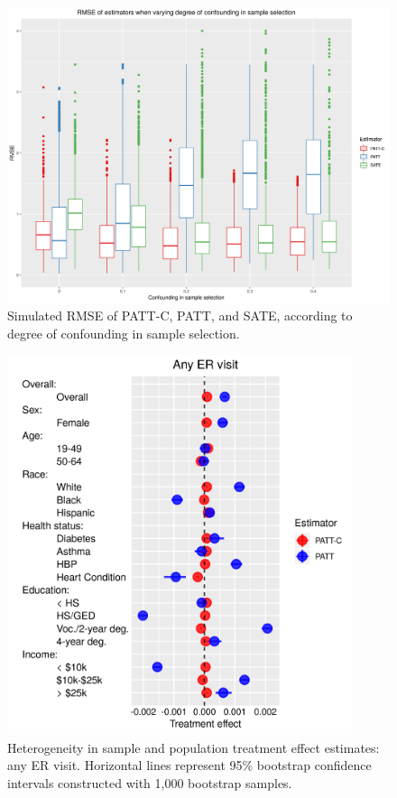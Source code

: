 \documentclass[hidelinks,12pt]{article}
\begin{document}
{\begin{appendices}
\begin{figure}[htbp]
	\begin{center}
		\includegraphics[width = 1\textwidth]{rmse_boxplots_RateConS}
		\caption{Simulated RMSE of PATT-C, PATT, and SATE, according to degree of confounding in sample selection.\label{fig:rmse_boxplots_RateConS}}
	\end{center}
\end{figure}

\begin{figure}[htbp]
	\begin{center}
		\includegraphics[width = 0.9\textwidth]{any-visit-plot}
		\caption{Heterogeneity in sample and population treatment effect estimates: any ER visit. Horizontal lines represent 95\% bootstrap confidence intervals constructed with 1,000 bootstrap samples.\label{fig:any-visit-plot}}
	\end{center}
\end{figure}



\end{appendices}}
\end{document}
